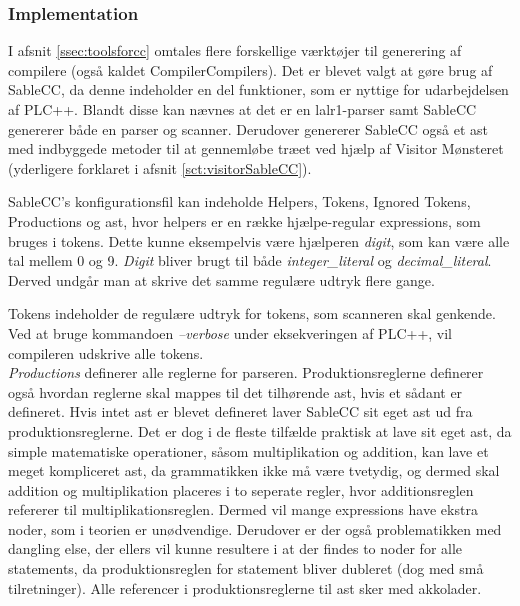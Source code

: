 \subsubsection{Implementation}

I afsnit \ref{ssec:toolsforcc} omtales flere forskellige værktøjer til generering af compilere (også kaldet CompilerCompilers). Det er blevet valgt at gøre brug af SableCC, da denne indeholder en del funktioner, som er nyttige for udarbejdelsen af PLC++. Blandt disse kan nævnes at det er en \gls{lalr}1-parser samt SableCC genererer både en parser og scanner. Derudover genererer SableCC også et \gls{ast} med indbyggede metoder til at gennemløbe træet ved hjælp af Visitor Mønsteret (yderligere forklaret i afsnit \ref{sct:visitorSableCC}).

SableCC's konfigurationsfil kan indeholde Helpers, Tokens, Ignored Tokens, Productions og \gls{ast}, hvor helpers er en række hjælpe-regular expressions, som bruges i tokens. Dette kunne eksempelvis være hjælperen \textit{digit}, som kan være alle tal mellem 0 og 9. \textit{Digit} bliver brugt til både \textit{integer\_literal} og \textit{decimal\_literal}. Derved undgår man at skrive det samme regulære udtryk flere gange.

Tokens indeholder de regulære udtryk for tokens, som scanneren skal genkende. Ved at bruge kommandoen \textit{--verbose} under eksekveringen af PLC++, vil compileren udskrive alle tokens.\\

\noindent \textit{Productions} definerer alle reglerne for parseren. Produktionsreglerne definerer også hvordan reglerne skal mappes til det tilhørende \gls{ast}, hvis et sådant er defineret. Hvis intet \gls{ast} er blevet defineret laver SableCC sit eget \gls{ast} ud fra produktionsreglerne. Det er dog i de fleste tilfælde praktisk at lave sit eget \gls{ast}, da simple matematiske operationer, såsom multiplikation og addition, kan lave et meget kompliceret \gls{ast}, da grammatikken ikke må være tvetydig, og dermed skal addition og multiplikation placeres i to seperate regler, hvor additionsreglen refererer til multiplikationsreglen. Dermed vil mange expressions have ekstra noder, som i teorien er unødvendige. Derudover er der også problematikken med dangling else, der ellers vil kunne resultere i at der findes to noder for alle statements, da produktionsreglen for statement bliver dubleret (dog med små tilretninger). Alle referencer i produktionsreglerne til \gls{ast} sker med akkolader. 

